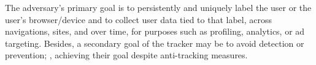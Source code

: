 %
%
%
The adversary's primary goal is to persistently and uniquely label the user or the user’s browser/device and to collect user data tied to that label, across navigations, sites, and over time, for purposes such as profiling, analytics, or ad targeting.
%
Besides, a secondary goal of the tracker may be to avoid detection or prevention; \ie{}, achieving their goal despite anti-tracking measures.



